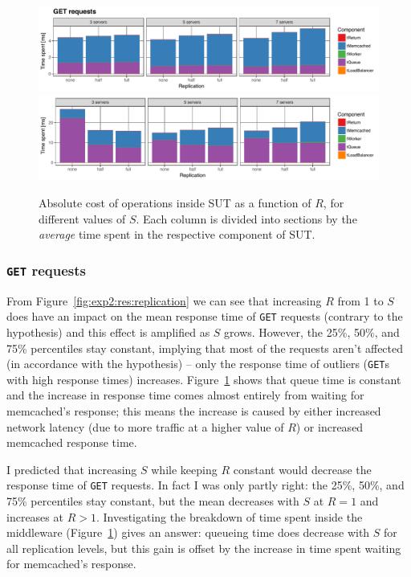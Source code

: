 \documentclass[11pt]{article}
\newcommand{\get}[0]{\texttt{GET}}
\begin{document}
\begin{figure}[h]
\centering
\includegraphics[width=\textwidth]{../results/replication/graphs/time_breakdown_vs_replication_get_abs.pdf}
\includegraphics[width=\textwidth]{../results/replication/graphs/time_breakdown_vs_replication_set_abs.pdf}
\caption{Absolute cost of operations inside SUT as a function of $R$, for different values of $S$. Each column is divided into sections by the \emph{average} time spent in the respective component of SUT.}
\label{fig:exp2:res:breakdown}
\end{figure}


\subsubsection{\get{} requests}
From Figure~\ref{fig:exp2:res:replication} we can see that increasing $R$ from 1 to $S$ does have an impact on the mean response time of \get{} requests (contrary to the hypothesis) and this effect is amplified as $S$ grows. However, the 25\%, 50\%, and 75\% percentiles stay constant, implying that most of the requests aren't affected (in accordance with the hypothesis) -- only the response time of outliers (\get{}s with high response times) increases. Figure~\ref{fig:exp2:res:breakdown} shows that queue time is constant and the increase in response time comes almost entirely from waiting for memcached's response; this means the increase is caused by either increased network latency (due to more traffic at a higher value of $R$) or increased memcached response time.

I predicted that increasing $S$ while keeping $R$ constant would decrease the response time of \get{} requests. In fact I was only partly right: the 25\%, 50\%, and 75\% percentiles stay constant, but the mean decreases with $S$ at $R=1$ and increases at $R>1$. Investigating the breakdown of time spent inside the middleware (Figure~\ref{fig:exp2:res:breakdown}) gives an answer: queueing time does decrease with $S$ for all replication levels, but this gain is offset by the increase in time spent waiting for memcached's response.
\end{document}

